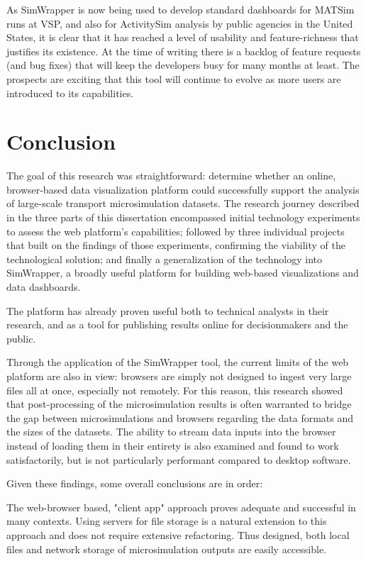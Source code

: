 
As SimWrapper is now being used to develop standard dashboards for MATSim runs at VSP, and also for ActivitySim analysis by public agencies in the United States, it is clear that it has reached a level of usability and feature-richness that justifies its existence. At the time of writing there is a backlog of feature requests (and bug fixes) that will keep the developers busy for many months at least. The prospects are exciting that this tool will continue to evolve as more users are introduced to its capabilities.

\section{Conclusion}
\label{08-conclusions-conclusion}

The goal of this research was straightforward: determine whether an online, browser-based data visualization platform could successfully support the analysis of large-scale transport microsimulation datasets. The research journey described in the three parts of this dissertation encompassed initial technology experiments to assess the web platform's capabilities; followed by three individual projects that built on the findings of those experiments, confirming the viability of the technological solution; and finally a generalization of the technology into SimWrapper, a broadly useful platform for building web-based visualizations and data dashboards.

The platform has already proven useful both to technical analysts in their research, and as a tool for publishing results online for decisionmakers and the public.

Through the application of the SimWrapper tool, the current limits of the web platform are also in view: browsers are simply not designed to ingest very large files all at once, especially not remotely. For this reason, this research showed that post-processing of the microsimulation results is often warranted to bridge the gap between microsimulations and browsers regarding the data formats and the sizes of the datasets. The ability to stream data inputs into the browser instead of loading them in their entirety is also examined and found to work satisfactorily, but is not particularly performant compared to desktop software.

Given these findings, some overall conclusions are in order:

The web-browser based, "client app" approach proves adequate and successful in many contexts. Using servers for file storage is a natural extension to this approach and does not require extensive refactoring. Thus designed, both local files and network storage of microsimulation outputs are easily accessible.

